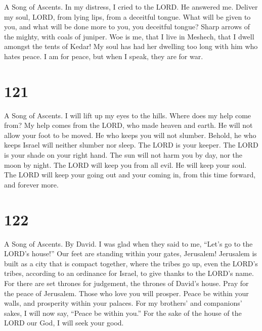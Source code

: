 A Song of Ascents.  In my distress, I cried to the LORD. He
answered me.  Deliver my soul, LORD, from lying lips, from a
deceitful tongue.  What will be given to you, and what will
be done more to you, you deceitful tongue?  Sharp arrows of
the mighty, with coals of juniper.  Woe is me, that I live
in Meshech, that I dwell amongst the tents of Kedar!  My
soul has had her dwelling too long with him who hates peace.
 I am for peace, but when I speak, they are for war.

\hypertarget{section-111}{%
\section{121}\label{section-111}}

A Song of Ascents.  I will lift up my eyes to the hills.
Where does my help come from?  My help comes from the LORD,
who made heaven and earth.  He will not allow your foot to
be moved. He who keeps you will not slumber.  Behold, he who
keeps Israel will neither slumber nor sleep.  The LORD is
your keeper. The LORD is your shade on your right hand.  The
sun will not harm you by day, nor the moon by night.  The
LORD will keep you from all evil. He will keep your soul. 
The LORD will keep your going out and your coming in, from this time
forward, and forever more.

\hypertarget{section-112}{%
\section{122}\label{section-112}}

A Song of Ascents. By David.  I was glad when they said to
me, ``Let's go to the LORD's house!''  Our feet are standing
within your gates, Jerusalem!  Jerusalem is built as a city
that is compact together,  where the tribes go up, even the
LORD's tribes, according to an ordinance for Israel, to give thanks to
the LORD's name.  For there are set thrones for judgement,
the thrones of David's house.  Pray for the peace of
Jerusalem. Those who love you will prosper.  Peace be within
your walls, and prosperity within your palaces.  For my
brothers' and companions' sakes, I will now say, ``Peace be within
you.''  For the sake of the house of the LORD our God, I
will seek your good.

